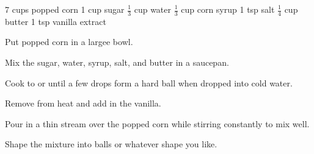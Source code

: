 \dishtype{}
\begin{ingreds}
    7 cups popped corn
    1 cup sugar
    $\frac{1}{3}$ cup water
    $\frac{1}{3}$ cup corn syrup
    1 tsp salt
    $\frac{1}{4}$ cup butter
    1 tsp vanilla extract
\end{ingreds}
\begin{method}
    Put popped corn in a largee bowl.\par
    Mix the sugar, water, syrup, salt, and butter in a saucepan.\par
    Cook to  or until a few drops form a hard ball when dropped into cold water.\par
    Remove from heat and add in the vanilla.\par
    Pour in a thin stream over the popped corn while stirring constantly to mix well.\par
    Shape the mixture into balls or whatever shape you like.
\end{method}